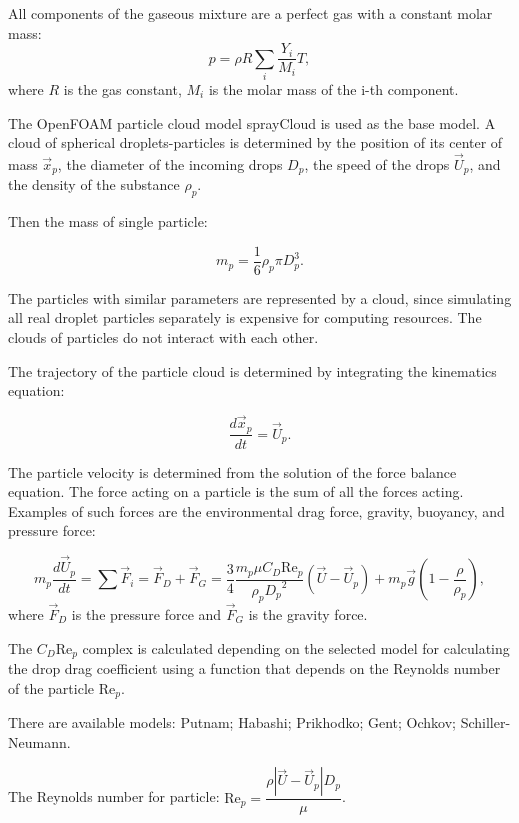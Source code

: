 \documentclass[aerospace,article,submit,moreauthors,pdftex]{Definitions/mdpi}
\begin{document}
All components of the gaseous mixture are a perfect gas with a constant molar mass:
$$ 
p = \rho R \sum_{i}^{}\frac{Y_{i}}{M_{i}}T,
$$
where $R$ is the gas constant, $M_{i}$ is the molar mass of the i-th component.

The OpenFOAM particle cloud model sprayCloud is used as the base model. A cloud of spherical droplets-particles is determined by the position of its center of mass ${\vec{x}}_{p}$, the diameter of the incoming drops $D_{p}$, the speed of the drops ${\vec{U}}_{p}$, and the density of the substance $\rho_{p}$.

Then the mass of single particle:

$$m_{p} = \frac{1}{6}\rho_{p}\pi D_{p}^{3}.$$

The particles with similar parameters are represented by a cloud, since simulating all real droplet particles separately is expensive for computing resources. The clouds of particles do not interact with each other.

The trajectory of the particle cloud is determined by integrating the kinematics equation:

\begin{equation}
    \frac{{d\vec{x}}_{p}}{dt} = {\vec{U}}_{p}.    
\end{equation}

The particle velocity is determined from the solution of the force balance equation. The force acting on a particle is the sum of all the forces acting. Examples of such forces are the environmental drag force, gravity, buoyancy, and pressure force:

\begin{equation}
    m_{p}\frac{{d\vec{U}}_{p}}{dt} = \sum{\vec{F}}_{i} = {\vec{F}}_{D} + {\vec{F}}_{G} = \frac{3}{4}\frac{m_{p}\mu C_{D}\text{Re}_{p}}{\rho_{p}{D_{p}}^{2}}(\vec{U} - {\vec{U}}_{p}) + m_{p}\vec{g}(1 - \frac{\rho}{\rho_{p}}),    
\end{equation}
where ${\vec{F}}_{D}$ is the pressure force and ${\vec{F}}_{G}$ is the gravity force.

The $C_{D} \text{Re}_p$ complex is calculated depending on the selected model for calculating the drop drag coefficient using a function that depends on the Reynolds number of the particle $\text{Re}_{p}$.

There are available models: Putnam; Habashi; Prikhodko; Gent; Ochkov; Schiller-Neumann.

The Reynolds number for particle: $\text{Re}_{p} = \dfrac{\rho|\vec U - \vec U_{p}|D_{p}}{\mu}$.
\end{document}
